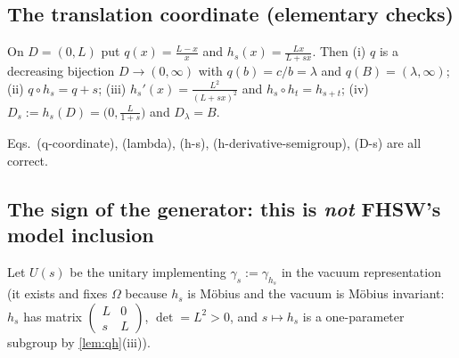 \documentclass[11pt]{article}
\begin{document}
\subsection{The translation coordinate (elementary checks)}

\begin{lemma}\label{lem:qh}
On $D=(0,L)$ put $q(x)=\frac{L-x}{x}$ and $h_s(x)=\frac{Lx}{L+sx}$. Then
\textup{(i)} $q$ is a decreasing bijection $D\to(0,\infty)$ with
$q(b)=c/b=\lambda$ and $q(B)=(\lambda,\infty)$;
\textup{(ii)} $q\circ h_s=q+s$;
\textup{(iii)} $h_s'(x)=\frac{L^2}{(L+sx)^2}$ and $h_s\circ h_t=h_{s+t}$;
\textup{(iv)} $D_s:=h_s(D)=\bigl(0,\frac L{1+s}\bigr)$ and $D_\lambda=B$.
\end{lemma}
\begin{verdictok}Eqs.~(q-coordinate), (lambda), (h-s),
(h-derivative-semigroup), (D-s) are all correct.\end{verdictok}

\subsection{The sign of the generator: this is \emph{not} FHSW's model inclusion}

Let $U(s)$ be the unitary implementing $\gamma_s:=\gamma_{h_s}$ in the vacuum
representation (it exists and fixes $\Omega$ because $h_s$ is M\"obius and the
vacuum is M\"obius invariant: $h_s$ has matrix
$\left(\begin{smallmatrix}L&0\\s&L\end{smallmatrix}\right)$, $\det=L^2>0$, and
$s\mapsto h_s$ is a one-parameter subgroup by \cref{lem:qh}(iii)).
\end{document}
